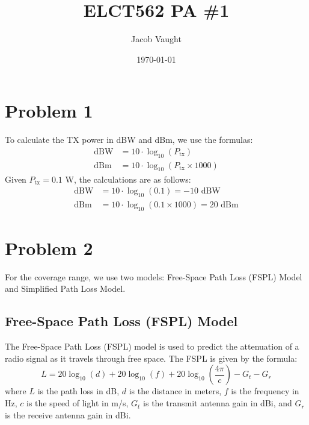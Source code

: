 \documentclass[11pt]{article}
\begin{document}
\title{ELCT562 PA \#1}
\author{Jacob Vaught}
\date{\today}
\maketitle

\section*{Problem 1}
To calculate the TX power in dBW and dBm, we use the formulas:
\begin{align*}
    \text{dBW} &= 10 \cdot \log_{10}(P_{\text{tx}}) \\
    \text{dBm} &= 10 \cdot \log_{10}(P_{\text{tx}} \times 1000)
\end{align*}
Given \( P_{\text{tx}} = 0.1 \) W, the calculations are as follows:
\begin{align*}
    \text{dBW} &= 10 \cdot \log_{10}(0.1) = -10 \text{ dBW} \\
    \text{dBm} &= 10 \cdot \log_{10}(0.1 \times 1000) = 20 \text{ dBm}
\end{align*}

\section*{Problem 2}
For the coverage range, we use two models: Free-Space Path Loss (FSPL) Model and Simplified Path Loss Model.

\subsection*{Free-Space Path Loss (FSPL) Model}
The Free-Space Path Loss (FSPL) model is used to predict the attenuation of a radio signal as it travels through free space. The FSPL is given by the formula:
\[
L = 20 \log_{10}(d) + 20 \log_{10}(f) + 20 \log_{10}\left(\frac{4\pi}{c}\right) - G_{t} - G_{r}
\]
where \(L\) is the path loss in dB, \(d\) is the distance in meters, \(f\) is the frequency in Hz, \(c\) is the speed of light in m/s, \(G_{t}\) is the transmit antenna gain in dBi, and \(G_{r}\) is the receive antenna gain in dBi.
\newline
\end{document}
